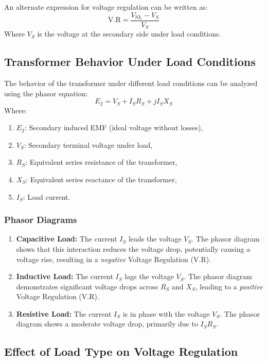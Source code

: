 \documentclass[a4paper,12pt]{article}
\begin{document}
An alternate expression for voltage regulation can be written as:
\[
\text{V.R} = \frac{V_{\text{NL}} - V_S}{V_S}
\]
Where $V_S$ is the voltage at the secondary side under load conditions.

\subsection{Transformer Behavior Under Load Conditions}

The behavior of the transformer under different load conditions can be analyzed using the phasor equation:
\[
E_2 = V_S + I_S R_S + j I_S X_S
\]
Where:
\begin{enumerate}
	\item $E_2$: Secondary induced EMF (ideal voltage without losses),
	\item $V_S$: Secondary terminal voltage under load,
	\item $R_S$: Equivalent series resistance of the transformer,
	\item $X_S$: Equivalent series reactance of the transformer,
	\item $I_S$: Load current.
\end{enumerate}

\subsubsection*{Phasor Diagrams}
\begin{enumerate}
	\item \textbf{Capacitive Load:}  
	The current $I_S$ leads the voltage $V_S$. The phasor diagram shows that this interaction reduces the voltage drop, potentially causing a voltage rise, resulting in a \emph{negative} Voltage Regulation (V.R).
	
	\item \textbf{Inductive Load:}  
	The current $I_S$ lags the voltage $V_S$. The phasor diagram demonstrates significant voltage drops across $R_S$ and $X_S$, leading to a \emph{positive} Voltage Regulation (V.R).
	
	\item \textbf{Resistive Load:}  
	The current $I_S$ is in phase with the voltage $V_S$. The phasor diagram shows a moderate voltage drop, primarily due to $I_S R_S$.
\end{enumerate}

\subsection{Effect of Load Type on Voltage Regulation}
\end{document}
